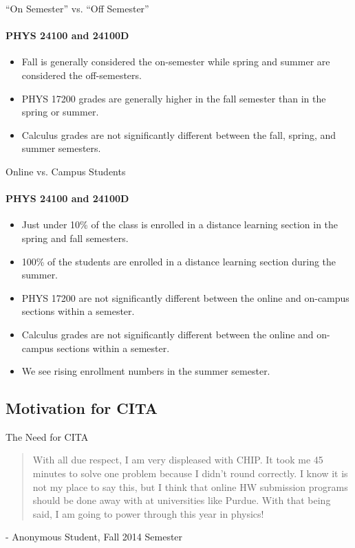 \documentclass[xcolor=x11names,compress]{beamer}
\begin{document}
\begin{frame}{``On Semester'' vs. ``Off Semester''}
	\framesubtitle{PHYS 24100 and 24100D}
	\begin{itemize}
		\item Fall is generally considered the on-semester while spring and summer are considered the off-semesters.
		\vspace{4mm}
		\item PHYS 17200 grades are generally higher in the fall semester than in the spring or summer.
		\vspace{4mm}
		\item Calculus grades are not significantly different between the fall, spring, and summer semesters.
	\end{itemize}
\end{frame}

\begin{frame}{Online vs. Campus Students}
	\framesubtitle{PHYS 24100 and 24100D}
	\begin{itemize}
		\item Just under 10\% of the class is enrolled in a distance learning section in the spring and fall semesters.
		\vspace{2mm}
		\item 100\% of the students are enrolled in a distance learning section during the summer.
		\vspace{2mm}
		\item PHYS 17200 are not significantly different between the online and on-campus sections within a semester.
		\vspace{2mm}
		\item Calculus grades are not significantly different between the online and on-campus sections within a semester.
		\vspace{2mm}
		\item We see rising enrollment numbers in the summer semester.
	\end{itemize}
\end{frame}

\subsection{Motivation for CITA}

\begin{frame}{The Need for CITA}
	\begin{quote}
	With all due respect, I am very displeased with CHIP.  It took me 45 minutes to solve one problem because I didn't round correctly.  I know it is not my place to say this, but I think that online HW submission programs should be done away with at universities like Purdue.  With that being said, I am going to power through this year in physics!
	\end{quote}
	\vspace{5mm}
	- Anonymous Student, Fall 2014 Semester
\end{frame}
\end{document}
